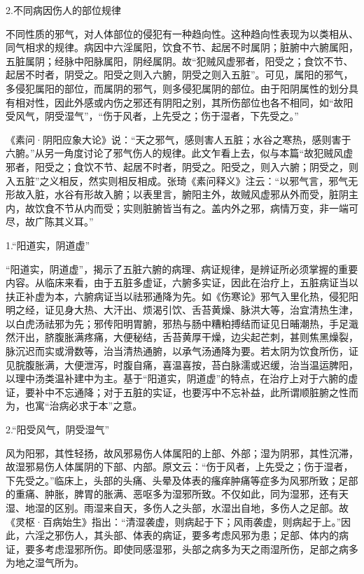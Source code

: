 \documentclass[12pt]{ctexbook}
\begin{document}
2.不同病因伤人的部位规律

不同性质的邪气，对人体部位的侵犯有一种趋向性。这种趋向性表现为以类相从、同气相求的规律。病因中六淫属阳，饮食不节、起居不时属阴；脏腑中六腑属阳，五脏属阴；经脉中阳脉属阳，阴经属阴。故“犯贼风虚邪者，阳受之；食饮不节、起居不时者，阴受之。阳受之则入六腑，阴受之则入五脏”。可见，属阳的邪气，多侵犯属阳的部位，而属阴的邪气，则多侵犯属阴的部位。由于阳阴属性的划分具有相对性，因此外感或内伤之邪还有阴阳之别，其所伤部位也各不相同，如“故阳受风气，阴受湿气”，“伤于风者，上先受之；伤于湿者，下先受之。”

《素问·阴阳应象大论》说：“天之邪气，感则害人五脏；水谷之寒热，感则害于六腑。”从另一角度讨论了邪气伤人的规律。此文乍看上去，似与本篇“故犯贼风虚邪者，阳受之；食饮不节、起居不时者，阴受之。阳受之，则入六腑；阴受之，则入五脏”之义相反，然实则相反相成。张琦《素问释义》注云：“以邪气言，邪气无形故入脏，水谷有形故入腑；以表里言，腑阳主外，故贼风虚邪从外而受，脏阴主内，故饮食不节从内而受；实则脏腑皆当有之。盖内外之邪，病情万变，非一端可尽，故广陈其义耳。”


1.“阳道实，阴道虚”

“阳道实，阴道虚”，揭示了五脏六腑的病理、病证规律，是辨证所必须掌握的重要内容。从临床来看，由于五脏多虚证，六腑多实证，因此在治疗上，五脏病证当以扶正补虚为本，六腑病证当以祛邪通降为先。如《伤寒论》邪气入里化热，侵犯阳明之经，证见身大热、大汗出、烦渴引饮、舌苔黄燥、脉洪大等，治宜清热生津，以白虎汤祛邪为先；邪传阳明胃腑，邪热与肠中糟粕搏结而证见日晡潮热，手足濈然汗出，脐腹胀满疼痛，大便秘结，舌苔黄厚干燥，边尖起芒刺，甚则焦黑燥裂，脉沉迟而实或滑数等，治当清热通腑，以承气汤通降为要。若太阴为饮食所伤，证见脘腹胀满，大便泄泻，时腹自痛，喜温喜按，苔白脉濡或迟缓，治当温运脾阳，以理中汤类温补建中为主。基于“阳道实，阴道虚”的特点，在治疗上对于六腑的虚证，要补中不忘通降；对于五脏的实证，也要泻中不忘补益，此所谓顺脏腑之性而为，也寓“治病必求于本”之意。

2.“阳受风气，阴受湿气”

风为阳邪，其性轻扬，故风邪易伤人体属阳的上部、外部；湿为阴邪，其性沉滞，故湿邪易伤人体属阴的下部、内部。原文云：“伤于风者，上先受之；伤于湿者，下先受之。”临床上，头部的头痛、头晕及体表的瘙痒肿痛等症多为风邪所致；足部的重痛、肿胀，脾胃的胀满、恶呕多为湿邪所致。不仅如此，同为湿邪，还有天湿、地湿的区别。雨湿来自天，多伤人之头部，水湿出自地，多伤人之足部。故《灵枢·百病始生》指出：“清湿袭虚，则病起于下；风雨袭虚，则病起于上。”因此，六淫之邪伤人，其头部、体表的病证，要多考虑风邪为患；足部、体内的病证，要多考虑湿邪所伤。即使同感湿邪，头部之病多为天之雨湿所伤，足部之病多为地之湿气所为。
\end{document}
